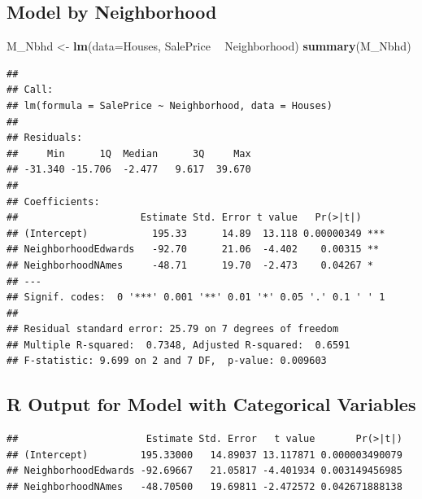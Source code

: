 \documentclass[]{book}
\newenvironment{Shaded}{\begin{snugshade}}{\end{snugshade}}
\newcommand{\KeywordTok}[1]{\textcolor[rgb]{0.13,0.29,0.53}{\textbf{#1}}}
\newcommand{\DataTypeTok}[1]{\textcolor[rgb]{0.13,0.29,0.53}{#1}}
\newcommand{\StringTok}[1]{\textcolor[rgb]{0.31,0.60,0.02}{#1}}
\newcommand{\OperatorTok}[1]{\textcolor[rgb]{0.81,0.36,0.00}{\textbf{#1}}}
\newcommand{\NormalTok}[1]{#1}
\begin{document}
\subsection{Model by Neighborhood}\label{model-by-neighborhood}

\begin{Shaded}
\begin{Highlighting}[]
\NormalTok{M_Nbhd <-}\StringTok{ }\KeywordTok{lm}\NormalTok{(}\DataTypeTok{data=}\NormalTok{Houses, SalePrice }\OperatorTok{~}\StringTok{ }\NormalTok{Neighborhood)}
\KeywordTok{summary}\NormalTok{(M_Nbhd)}
\end{Highlighting}
\end{Shaded}

\begin{verbatim}
## 
## Call:
## lm(formula = SalePrice ~ Neighborhood, data = Houses)
## 
## Residuals:
##     Min      1Q  Median      3Q     Max 
## -31.340 -15.706  -2.477   9.617  39.670 
## 
## Coefficients:
##                     Estimate Std. Error t value   Pr(>|t|)    
## (Intercept)           195.33      14.89  13.118 0.00000349 ***
## NeighborhoodEdwards   -92.70      21.06  -4.402    0.00315 ** 
## NeighborhoodNAmes     -48.71      19.70  -2.473    0.04267 *  
## ---
## Signif. codes:  0 '***' 0.001 '**' 0.01 '*' 0.05 '.' 0.1 ' ' 1
## 
## Residual standard error: 25.79 on 7 degrees of freedom
## Multiple R-squared:  0.7348, Adjusted R-squared:  0.6591 
## F-statistic: 9.699 on 2 and 7 DF,  p-value: 0.009603
\end{verbatim}

\subsection{R Output for Model with Categorical
Variables}\label{r-output-for-model-with-categorical-variables}

\begin{verbatim}
##                      Estimate Std. Error   t value       Pr(>|t|)
## (Intercept)         195.33000   14.89037 13.117871 0.000003490079
## NeighborhoodEdwards -92.69667   21.05817 -4.401934 0.003149456985
## NeighborhoodNAmes   -48.70500   19.69811 -2.472572 0.042671888138
\end{verbatim}
\end{document}
